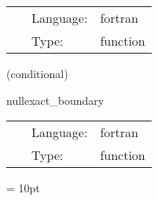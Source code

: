 \hspace{5mm}

 \begin{tabular*}{160mm}{cll} 
~ & Language:  & fortran \\ 
~ & Type:  & function \\ 
\end{tabular*} 


\vspace{5mm}

   (conditional) 

\hspace{5mm} nullexact\_boundary 

\hspace{5mm}{\it exact boundary data for the characteristic evolution variables } 


\hspace{5mm}

 \begin{tabular*}{160mm}{cll} 
~ & Language:  & fortran \\ 
~ & Type:  & function \\ 
\end{tabular*} 



\vspace{5mm}\parskip = 10pt 

